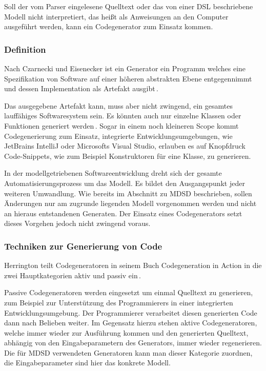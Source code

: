 \documentclass[12pt,oneside,a4paper,parskip]{scrbook}
\begin{document}
Soll der vom Parser eingelesene Quelltext oder das von einer DSL beschriebene Modell nicht interpretiert, das heißt als Anweisungen an den Computer ausgeführt werden, kann ein Codegenerator zum Einsatz kommen.

\subsubsection{Definition}

Nach Czarnecki und Eisenecker ist ein Generator ein Programm welches eine Spezifikation von Software auf einer höheren abstrakten Ebene entgegennimmt und dessen Implementation als Artefakt ausgibt\,\cite[S. 333]{czaeis2000}.

Das ausgegebene Artefakt kann, muss aber nicht zwingend, ein gesamtes lauffähiges Softwaresystem sein. Es könnten auch nur einzelne Klassen oder Funktionen generiert werden\,\cite[S. 333]{czaeis2000}. Sogar in einem noch kleineren Scope kommt Codegenerierung zum Einsatz, integrierte Entwicklungsumgebungen, wie JetBrains IntelliJ oder Microsofts Visual Studio, erlauben es auf Knopfdruck Code-Snippets, wie zum Beispiel Konstruktoren für eine Klasse, zu generieren.

In der modellgetriebenen Softwareentwicklung dreht sich der gesamte Automatisierungsprozess um das Modell. Es bildet den Ausgangspunkt jeder weiteren Umwandlung. Wie bereits im Abschnitt zu MDSD beschrieben, sollen Änderungen nur am zugrunde liegenden Modell vorgenommen werden und nicht an hieraus entstandenen Generaten. Der Einsatz eines Codegenerators setzt dieses Vorgehen jedoch nicht zwingend voraus.

\subsubsection{Techniken zur Generierung von Code}

Herrington teilt Codegeneratoren in seinem Buch Codegeneration in Action in die zwei Hauptkategorien aktiv und passiv ein\,\cite[S. 28]{herrington2003}. 

Passive Codegeneratoren werden eingesetzt um einmal Quelltext zu generieren, zum Beispiel zur Unterstützung des Programmierers in einer integrierten Entwicklungsumgebung. Der Programmierer verarbeitet diesen generierten Code dann nach Belieben weiter. Im Gegensatz hierzu stehen aktive Codegeneratoren, welche immer wieder zur Ausführung kommen und den generierten Quelltext, abhängig von den Eingabeparametern des Generators, immer wieder regenerieren. Die für MDSD verwendeten Generatoren kann man dieser Kategorie zuordnen, die Eingabeparameter sind hier das konkrete Modell. 
\end{document}
